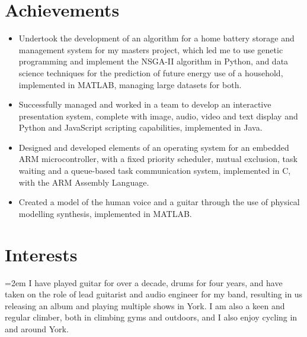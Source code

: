 \documentclass[12pt]{article} %
\newcommand{\interests}[1]{
  \vspace*{0.5em}
  \noindent\hangindent=2em\hangafter=0 \small #1 
}
\begin{document}
\section*{Achievements}
\begin{itemize}
  \item Undertook the development of an algorithm for a home battery storage and management system for my masters project, which led me to use genetic programming and implement the NSGA-II algorithm in Python, and data science techniques for the prediction of future energy use of a household, implemented in MATLAB, managing large datasets for both.
  \item Successfully managed and worked in a team to develop an interactive presentation system, complete with image, audio, video and text display and Python and JavaScript scripting capabilities, implemented in Java.
  \item Designed and developed elements of an operating system for an embedded ARM microcontroller, with a fixed priority scheduler, mutual exclusion, task waiting and a queue-based task communication system, implemented in C, with the ARM Assembly Language.
  \item Created a model of the human voice and a guitar through the use of physical modelling synthesis, implemented in MATLAB.
\end{itemize}

\section*{Interests}
\interests{I have played guitar for over a decade, drums for four years, and have taken on the role of lead guitarist and audio engineer for my band, resulting in us releasing an album and playing multiple shows in York. I am also a keen and regular climber, both in climbing gyms and outdoors, and I also enjoy cycling in and around York.}
\end{document}
